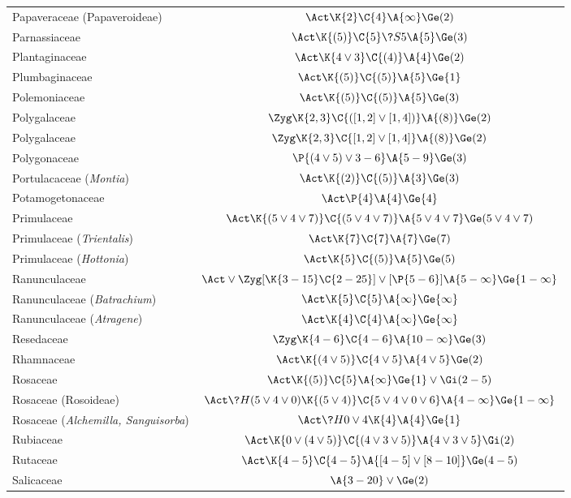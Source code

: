 \documentclass[12pt]{article}
\begin{document}
\begin{longtable}{lc}
Papaveraceae (Papaveroideae) & $\Act\K{2}\C{4}\A{\infty}\Ge(2)$\\[2pt]
Parnassiaceae & $\Act\K{(5)}\C{5}\?{S}{5}\A{5}\Ge(3)$\\[2pt]
Plantaginaceae  & $\Act\K{4\vee3}\C{(4)}\A{4}\Ge(2)$\\[2pt]
Plumbaginaceae & $\Act\K{(5)}\C{(5)}\A{5}\Ge{1}$\\[2pt]
Polemoniaceae & $\Act\K{(5)}\C{(5)}\A{5}\Ge(3)$\\[2pt]
Polygalaceae & $\Zyg\K{2,3}\C{([1,2]\vee[1,4])}\A{(8)}\Ge(2)$\\[2pt]
Polygalaceae & $\Zyg\K{2,3}\C{[1,2]\vee[1,4]}\A{(8)}\Ge(2)$\\[2pt]
Polygonaceae & $\P{(4\vee5)\vee3-6}\A{5-9}\Ge(3)$\\[2pt]
Portulacaceae (\textit{Montia}) & $\Act\K{(2)}\C{(5)}\A{3}\Ge(3)$\\[2pt]
Potamogetonaceae & $\Act\P{4}\A{4}\Ge{4}$\\[2pt]
Primulaceae & $\Act\K{(5\vee4\vee7)}\C{(5\vee4\vee7)}\A{5\vee4\vee7}\Ge(5\vee4\vee7)$\\[2pt]
Primulaceae (\textit{Trientalis}) & $\Act\K{7}\C{7}\A{7}\Ge(7)$\\[2pt]
Primulaceae (\textit{Hottonia}) & $\Act\K{5}\C{(5)}\A{5}\Ge(5)$\\[2pt]
Ranunculaceae & $\Act\vee\Zyg [\K{3-15}\C{2-25}]\vee[\P{5-6}]\A{5-\infty}\Ge{1-\infty}$\\[2pt]
Ranunculaceae (\textit{Batrachium}) & $\Act\K{5}\C{5}\A{\infty}\Ge{\infty}$\\[2pt]
Ranunculaceae (\textit{Atragene}) & $\Act\K{4}\C{4}\A{\infty}\Ge{\infty}$\\[2pt]
Resedaceae & $\Zyg\K{4-6}\C{4-6}\A{10-\infty}\Ge(3)$\\[2pt]
Rhamnaceae & $\Act\K{(4\vee5)}\C{4\vee5}\A{4\vee5}\Ge(2)$\\[2pt]
Rosaceae & $\Act\K{(5)}\C{5}\A{\infty}\Ge{1}\vee\Gi(2-5)$\\[2pt]
Rosaceae (Rosoideae) & $\Act\?{H}{(5\vee4\vee0)}\K{(5\vee4)}\C{5\vee4\vee0\vee6}\A{4-\infty}\Ge{1-\infty}$\\[2pt]
Rosaceae (\textit{Alchemilla, Sanguisorba}) & $\Act\?{H}{0\vee4}\K{4}\A{4}\Ge{1}$\\[2pt]
Rubiaceae & $\Act\K{0\vee(4\vee5)}\C{(4\vee3\vee5)}\A{4\vee3\vee5}\Gi(2)$\\[2pt]
Rutaceae & $\Act\K{4-5}\C{4-5}\A{[4-5]\vee[8-10]}\Ge(4-5)$\\[2pt]
Salicaceae & $\A{3-20}\vee\Ge(2)$\\[2pt]

\end{longtable}
\end{document}

